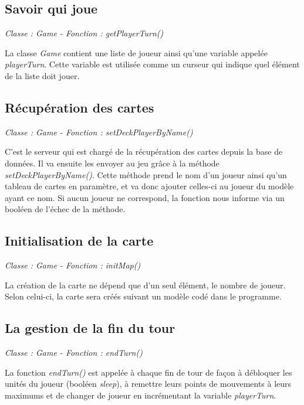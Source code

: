\documentclass[a4paper,11pt]{report}
\begin{document}
      \subsection{Savoir qui joue}
        \begin{center}
        \textit{Classe : Game - Fonction : getPlayerTurn()}
        \end{center}
        La classe \textit{Game} contient une liste de joueur ainsi qu'une variable appelée \textit{playerTurn}. Cette variable est utilisée comme un curseur qui indique quel élément de la liste doit jouer.

      \subsection{Récupération des cartes}
        \begin{center}
        \textit{Classe : Game - Fonction : setDeckPlayerByName()}
        \end{center}
        C'est le serveur qui est chargé de la récupération des cartes depuis la base de données. Il va ensuite les envoyer au jeu grâce à la méthode \textit{setDeckPlayerByName()}. Cette méthode prend le nom d'un joueur ainsi qu'un tableau de cartes en paramètre, et va donc ajouter celles-ci au joueur du modèle ayant ce nom. Si aucun joueur ne correspond, la fonction nous informe via un booléen de l'échec de la méthode.
        
        \subsection{Initialisation de la carte}
        \begin{center}
        \textit{Classe : Game - Fonction : initMap()}
        \end{center}
        La création de la carte ne dépend que d'un seul élément, le nombre de joueur. Selon celui-ci, la carte sera créés suivant un modèle codé dans le programme.
        
        \subsection{La gestion de la fin du tour}
        \begin{center}
        \textit{Classe : Game - Fonction : endTurn()}
        \end{center}
        La fonction \textit{endTurn()} est appelée à chaque fin de tour de façon à débloquer les unités du joueur (booléen \textit{sleep}), à remettre leurs points de mouvements à leurs maximums et de changer de joueur en incrémentant la variable \textit{playerTurn}. 
        
\end{document}
